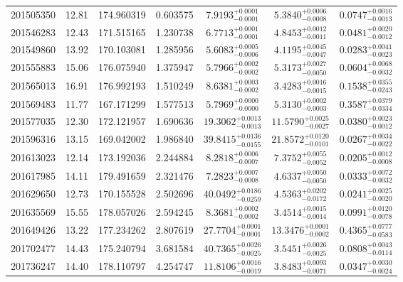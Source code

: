 \begin{tabular}{ccccccc}
201505350 &12.81& 174.960319 & 0.603575 & $7.9193_{-0.0001}^{+0.0001}$ & $5.3840_{-0.0008}^{+0.0006}$ & $0.0747_{-0.0013}^{+0.0016}$ \\
201546283 &12.43& 171.515165 & 1.230738 & $6.7713_{-0.0001}^{+0.0001}$ & $4.8453_{-0.0011}^{+0.0012}$ & $0.0481_{-0.0012}^{+0.0020}$ \\
201549860 &13.92& 170.103081 & 1.285956 & $5.6083_{-0.0006}^{+0.0005}$ & $4.1195_{-0.0047}^{+0.0045}$ & $0.0283_{-0.0023}^{+0.0041}$ \\
201555883 &15.06& 176.075940 & 1.375947 & $5.7966_{-0.0002}^{+0.0002}$ & $5.3173_{-0.0050}^{+0.0027}$ & $0.0604_{-0.0032}^{+0.0068}$ \\
201565013 &16.91& 176.992193 & 1.510249 & $8.6381_{-0.0002}^{+0.0003}$ & $3.4283_{-0.0015}^{+0.0016}$ & $0.1538_{-0.0243}^{+0.0355}$ \\
201569483 &11.77& 167.171299 & 1.577513 & $5.7969_{-0.0000}^{+0.0000}$ & $5.3130_{-0.0003}^{+0.0002}$ & $0.3587_{-0.0334}^{+0.0379}$ \\
201577035 &12.30& 172.121957 & 1.690636 & $19.3062_{-0.0013}^{+0.0013}$ & $11.5790_{-0.0027}^{+0.0025}$ & $0.0380_{-0.0012}^{+0.0023}$ \\
201596316 &13.15& 169.042002 & 1.986840 & $39.8415_{-0.0155}^{+0.0136}$ & $21.8572_{-0.0101}^{+0.0120}$ & $0.0267_{-0.0022}^{+0.0034}$ \\
201613023 &12.14& 173.192036 & 2.244884 & $8.2818_{-0.0007}^{+0.0006}$ & $7.3752_{-0.0052}^{+0.0055}$ & $0.0205_{-0.0008}^{+0.0012}$ \\
201617985 &14.11& 179.491659 & 2.321476 & $7.2823_{-0.0008}^{+0.0007}$ & $4.6337_{-0.0050}^{+0.0050}$ & $0.0333_{-0.0032}^{+0.0072}$ \\
201629650 &12.73& 170.155528 & 2.502696 & $40.0492_{-0.0259}^{+0.0186}$ & $4.5363_{-0.0172}^{+0.0202}$ & $0.0241_{-0.0020}^{+0.0025}$ \\
201635569 &15.55& 178.057026 & 2.594245 & $8.3681_{-0.0002}^{+0.0002}$ & $3.4514_{-0.0014}^{+0.0015}$ & $0.0991_{-0.0078}^{+0.0120}$ \\
201649426 &13.22& 177.234262 & 2.807619 & $27.7704_{-0.0001}^{+0.0001}$ & $13.3476_{-0.0002}^{+0.0001}$ & $0.4365_{-0.0583}^{+0.0777}$ \\
201702477 &14.43& 175.240794 & 3.681584 & $40.7365_{-0.0025}^{+0.0026}$ & $3.5451_{-0.0025}^{+0.0026}$ & $0.0808_{-0.0114}^{+0.0043}$ \\
201736247 &14.40& 178.110797 & 4.254747 & $11.8106_{-0.0019}^{+0.0016}$ & $3.8483_{-0.0071}^{+0.0093}$ & $0.0347_{-0.0024}^{+0.0030}$ \\

\end{tabular}
